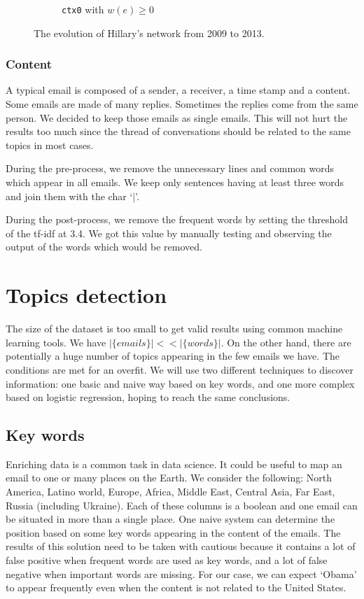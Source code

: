 \documentclass[11pt]{article}
\begin{document}
\begin{figure}[!t]
\begin{subfigure}[b]{0.3\linewidth}
		\caption[]%
		{{\small \texttt{ctx0} with $w(e) \geq 0$}}
		\label{fig:network_ctx2}
	\end{subfigure}
	\caption{The evolution of Hillary's network from 2009 to 2013.}
	\label{fig:network_evolution}
\end{figure}

\subsubsection{Content}

A typical email is composed of a sender, a receiver, a time stamp and a content. Some emails are made of many replies. Sometimes the replies come from the same person. We decided to keep those emails as single emails. This will not hurt the results too much since the thread of conversations should be related to the same topics in most cases.

During the pre-process, we remove the unnecessary lines and common words which appear in all emails. We keep only sentences having at least three words and join them with the char `$|$'.

During the post-process, we remove the frequent words by setting the threshold of the tf-idf at 3.4. We got this value by manually testing and observing the output of the words which would be removed.

\section{Topics detection}
\label{sec:topics_detection}

The size of the dataset is too small to get valid results using common machine learning tools. We have $|\{ emails \}| << |\{ words \}|$. On the other hand, there are potentially a huge number of topics appearing in the few emails we have. The conditions are met for an overfit. We will use two different techniques to discover information: one basic and naive way based on key words, and one more complex based on logistic regression, hoping to reach the same conclusions.

\subsection{Key words}

Enriching data is a common task in data science. It could be useful to map an email to one or many places on the Earth. We consider the following: North America, Latino world, Europe, Africa, Middle East, Central Asia, Far East, Russia (including Ukraine). Each of these columns is a boolean and one email can be situated in more than a single place. One naive system can determine the position based on some key words appearing in the content of the emails. The results of this solution need to be taken with cautious because it contains a lot of false positive when frequent words are used as key words, and a lot of false negative when important words are missing. For our case, we can expect `Obama' to appear frequently even when the content is not related to the United States.
\end{document}
